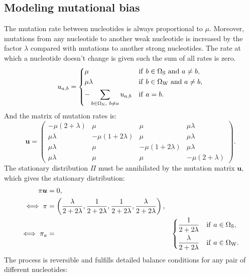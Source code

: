 \subsection{Modeling mutational bias}
\label{sec:mutBias}
The mutation rate between nucleotides is always proportional to $\mu$.
Moreover, mutations from any nucleotide to another weak nucleotide is increased by the factor $\lambda$ compared with mutations to another strong nucleotides.
The rate at which a nucleotide doesn't change is given such the sum of all rates is zero.
\begin{equation}
\label{nucRates}
u_{a, b} =
\begin{dcases}
\mu
& \mathrm{if} \ b \in \Omega_{\mathrm{S}} \ \mathrm{ and } \ a \neq b, \\
\mu \lambda
& \mathrm{if} \ b \in  \Omega_{\mathrm{W}} \ \mathrm{ and } \ a \neq b,  \\
- \sum_{b \in \Omega_{\mathrm{N}}, \ b \neq a }  u_{a, b}
& \mathrm{if} \ a = b.
\end{dcases}
\end{equation}
And the matrix of mutation rates is:
\begin{equation}
\label{nucMatrix}
\bm{u} =
\begin{pmatrix}
{-\mu(2 + \lambda)} & {\mu} & {\mu} & {\mu \lambda} \\
{\mu \lambda} & {-\mu(1 + 2\lambda)} & {\mu} & {\mu \lambda} \\
{\mu \lambda} & {\mu} & {-\mu(1 + 2\lambda)} & {\mu \lambda} \\
{\mu \lambda} & {\mu} & {\mu} & {-\mu(2 + \lambda)}
\end{pmatrix}.
\end{equation}
The stationary distribution $\Pi$ must be annihilated by the mutation matrix $\bm{u}$, which gives the stationary distribution:
\begin{align}
\pi \bm{u}
& =0, \\
\iff \pi
& =\left( \dfrac{\lambda}{2+2\lambda}, \dfrac{1}{2+2\lambda}, \dfrac{1}{2+2\lambda}, \dfrac{\lambda}{2+2\lambda} \right), \\
\iff \pi_a
& = &
\begin{dcases}
\dfrac{1}{2+2\lambda} & \mathrm{if} \ a \in \Omega_{\mathrm{S}}, \\
\dfrac{\lambda}{2+2\lambda} & \mathrm{if} \ a \in  \Omega_{\mathrm{W}}.
 \\
\end{dcases}
\label{nucStationarity}
\end{align}
The process is reversible and fulfills detailed balance conditions for any pair of different nucleotides:
